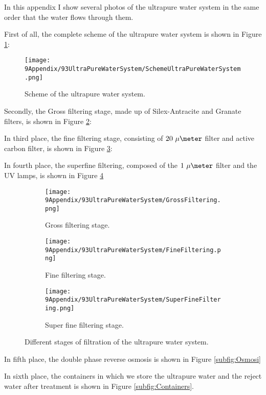 In this appendix I show several photos of the ultrapure water system in the same order that the water flows through them.

First of all, the complete scheme of the ultrapure water system is shown in Figure \ref{fig:SchemeUPWS}:

\begin{figure}[htbp]
\centering
\texttt{[image: 9Appendix/93UltraPureWaterSystem/SchemeUltraPureWaterSystem.png]}
\caption{Scheme of the ultrapure water system.\label{fig:SchemeUPWS}}
\end{figure}

Secondly, the Gross filtering stage, made up of Silex-Antracite and Granate filters, is shown in Figure \ref{subfig:GrossFiltering}:

In third place, the fine filtering stage, consisting of $20~\mu\meter$ filter and active carbon filter, is shown in Figure \ref{subfig:FineFiltering}:

In fourth place, the superfine filtering, composed of the $1~\mu\meter$ filter and the UV lamps, is shown in Figure \ref{subfig:SuperFineFiltering}

\begin{figure}
\centering
    \begin{subfigure}[b]{0.3\textwidth}
    \centering
    \texttt{[image: 9Appendix/93UltraPureWaterSystem/GrossFiltering.png]}  
    \caption{Gross filtering stage.\label{subfig:GrossFiltering}}
    \end{subfigure}
    \hfill
    \begin{subfigure}[b]{0.3\textwidth}
    \centering
    \texttt{[image: 9Appendix/93UltraPureWaterSystem/FineFiltering.png]}  
    \caption{Fine filtering stage.\label{subfig:FineFiltering}}
    \end{subfigure}
    \hfill
    \begin{subfigure}[b]{0.3\textwidth}
    \centering
    \texttt{[image: 9Appendix/93UltraPureWaterSystem/SuperFineFiltering.png]}  
    \caption{Super fine filtering stage.\label{subfig:SuperFineFiltering}}
    \end{subfigure}
 \caption{Different stages of filtration of the ultrapure water system.}
 \label{fig:UltraPureWaterStages}
\end{figure}

In fifth place, the double phase reverse osmosis is shown in Figure \ref{subfig:Osmosi}

In sixth place, the containers in which we store the ultrapure water and the reject water after treatment is shown in Figure \ref{subfig:Containers}.

